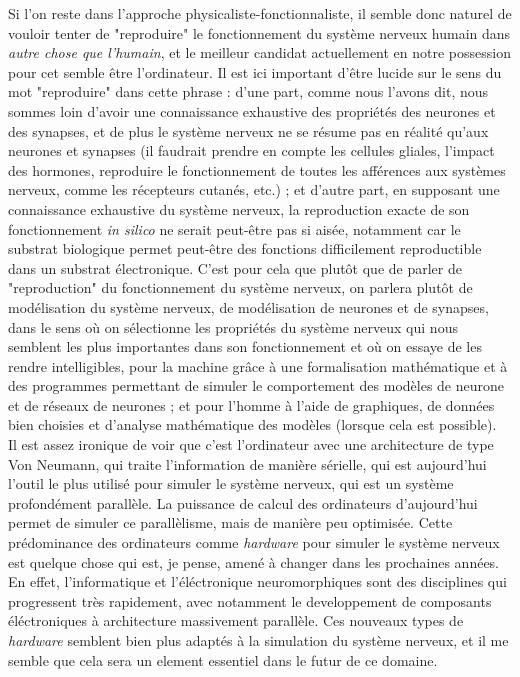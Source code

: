 \documentclass[12pt]{scrartcl}
\begin{document}
Si l'on reste dans l'approche physicaliste-fonctionnaliste, il semble donc naturel de vouloir tenter de "reproduire" le fonctionnement du système nerveux humain dans \textit{autre chose que l'humain}, et le meilleur candidat actuellement en notre possession pour cet  semble être l'ordinateur. Il est ici important d'être lucide sur le sens du mot "reproduire" dans cette phrase : d'une part, comme nous l'avons dit, nous sommes loin d'avoir une connaissance exhaustive des propriétés des neurones et des synapses, et de plus le système nerveux ne se résume pas en réalité qu'aux neurones et synapses (il faudrait prendre en compte les cellules gliales, l'impact des hormones, reproduire le fonctionnement de toutes les afférences aux systèmes nerveux, comme les récepteurs cutanés, etc.) ; et d'autre part, en supposant une connaissance exhaustive du système nerveux, la reproduction exacte de son fonctionnement \textit{in silico} ne serait peut-être pas si aisée, notamment car le substrat biologique permet peut-être des fonctions difficilement reproductible dans un substrat électronique. C'est pour cela que plutôt que de parler de "reproduction" du fonctionnement du système nerveux, on parlera plutôt de modélisation du système nerveux, de modélisation de neurones et de synapses, dans le sens où on sélectionne les propriétés du système nerveux qui nous semblent les plus importantes dans son fonctionnement et où on essaye de les rendre intelligibles, pour la machine grâce à une formalisation mathématique et à des programmes permettant de simuler le comportement des modèles de neurone et de réseaux de neurones ; et pour l'homme à l'aide de graphiques, de données bien choisies et d'analyse mathématique des modèles (lorsque cela est possible).\\

Il est assez ironique de voir que c'est l'ordinateur avec une architecture de type Von Neumann, qui traite l'information de manière sérielle, qui est aujourd'hui l'outil le plus utilisé pour simuler le système nerveux, qui est un système profondément parallèle. La puissance de calcul des ordinateurs d'aujourd'hui permet de simuler ce parallèlisme, mais de manière peu optimisée. Cette prédominance des ordinateurs  comme \textit{hardware} pour simuler le système nerveux est quelque chose qui est, je pense, amené à changer dans les prochaines années. En effet, l'informatique et l'éléctronique neuromorphiques sont des disciplines qui progressent très rapidement, avec notamment le developpement de composants éléctroniques à architecture massivement parallèle. Ces nouveaux types de \textit{hardware} semblent bien plus adaptés à la simulation du système nerveux, et il me semble que cela sera un element essentiel dans le futur de ce domaine.\\
\end{document}
